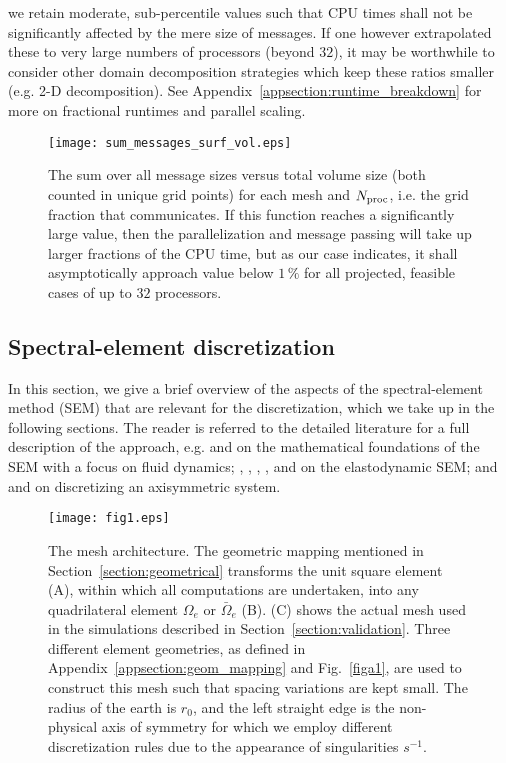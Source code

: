 we retain moderate, sub-percentile values such that CPU times shall not be
significantly affected by the mere size of messages.
If one however extrapolated these to very large numbers of processors (beyond $32$),
it may be worthwhile to consider other domain decomposition strategies
which keep these ratios smaller (e.g. 2-D decomposition).
See Appendix~\ref{appsection:runtime_breakdown}
for more on fractional runtimes and parallel scaling.
%
\begin{figure}[t!]
\begin{center}
\texttt{[image: sum\_messages\_surf\_vol.eps]}
\caption{The sum over all message sizes versus total volume size
(both counted in unique grid points) for each mesh and $N_{\rm proc}$,
i.e. the grid fraction that communicates.
If this function reaches a significantly large value, then the
parallelization and message passing will take up larger fractions
of the CPU time, but as our case indicates, it shall asymptotically
approach value below $1\,\%$ for all projected, feasible cases of
up to $32$ processors. }
\label{img:message_surf_vol}
\end{center}
\end{figure}
%
%
\subsection{Spectral-element discretization}
In this section, we give a brief overview of the aspects of the
spectral-element method (SEM) that are relevant for the discretization,
which we take up in the following sections.
The reader is referred to the detailed literature
for a full description of the approach, e.g. \citet{dfm} and
\citet{karniadakis}
on the mathematical foundations of the SEM with a focus on fluid dynamics;
\citet{KoVi98}, \citet{KoTr99}, \citet{KoTr02a}, \citet{manu03}, and
\citet{Chaljub+:06} on the
elastodynamic SEM; and \citet{bernardi} and \citet{fournier04} on
discretizing an axisymmetric system.
%
%
\begin{figure}[htb!]
\begin{center}
\texttt{[image: fig1.eps]}
\caption{The mesh architecture. The geometric mapping mentioned in
Section~\ref{section:geometrical} transforms the unit square element (A),
within which all computations are undertaken, into any quadrilateral element
$\Omega_e$ or $\bar{\Omega}_e$ (B). (C) shows the actual mesh used
in the simulations described in Section~\ref{section:validation}.
Three different element geometries, as defined in
Appendix~\ref{appsection:geom_mapping} and
Fig.~\ref{figa1}, are used to construct this mesh such that spacing
variations are kept small. The radius of the earth is $r_0$, and
the left straight edge is the non-physical axis of
symmetry for which we employ different discretization rules due to the
appearance of singularities $s^{-1}$.}
\label{fig1}
\end{center}
\end{figure}
%
